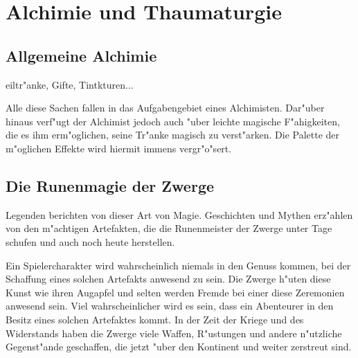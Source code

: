 \section{Alchimie und
Thaumaturgie} \label{alchimie}
\subsection{Allgemeine Alchimie}
eiltr"anke, Gifte, Tintkturen...
\par Alle diese Sachen fallen in das Aufgabengebiet eines Alchimisten. Dar"uber hinaus 
verf"ugt der Alchimist jedoch auch "uber leichte magische F"ahigkeiten, die es ihm erm"oglichen, 
seine Tr"anke magisch zu verst"arken. Die Palette der m"oglichen Effekte wird hiermit immens 
vergr"o"sert.

\subsection{Die Runenmagie der Zwerge}
\par Legenden berichten von dieser Art von Magie. Geschichten und Mythen erz"ahlen von den m"achtigen 
Artefakten, die die Runenmeister der Zwerge unter Tage schufen und auch noch heute herstellen.
\par Ein Spielercharakter wird wahrscheinlich niemals in den Genuss kommen, bei der Schaffung eines 
solchen Artefakts anwesend zu sein. Die Zwerge h"uten diese Kunst wie ihren Augapfel und selten 
werden Fremde bei einer diese Zeremonien anwesend sein. Viel wahrscheinlicher wird es sein, 
dass ein Abenteurer in den Besitz eines solchen Artefaktes kommt. In der Zeit der Kriege und 
des Widerstands haben die Zwerge viele Waffen, R"ustungen und andere n"utzliche Gegenst"ande 
geschaffen, die jetzt "uber den Kontinent und weiter zerstreut sind.
